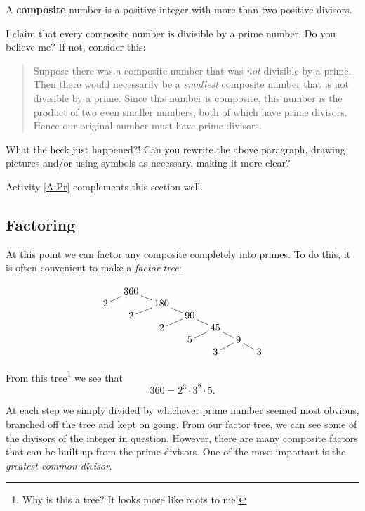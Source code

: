 \begin{definition} 
A \textbf{composite} number is a positive integer with more than two
positive divisors.
\end{definition}

I claim that every composite number is divisible by a prime number. Do
you believe me? If not, consider this:
\begin{quote}
Suppose there was a composite number that was \textit{not} divisible
by a prime. Then there would necessarily be a \textit{smallest}
composite number that is not divisible by a prime. Since this number
is composite, this number is the product of two even smaller numbers,
both of which have prime divisors. Hence our original number must have
prime divisors.
\end{quote}
\begin{question} 
What the heck just happened?! Can you rewrite the above paragraph,
drawing pictures and/or using symbols as necessary, making it more
clear?
\end{question}
\QM


\begin{activitynote}
Activity \ref{A:Pr} complements this section well.  %
\end{activitynote}


\subsection{Factoring}

At this point we can factor any composite completely into primes. To
do this, it is often convenient to make a \textit{factor
  tree}:

\[
\xymatrix@R=0pt@C=10pt{
  & 360 \ar@{-}[dl] \ar@{-}[dr] & & & & &\\
2 &     & 180 \ar@{-}[dl] \ar@{-}[dr] & & & & \\ 
  &  2   &     & 90 \ar@{-}[dl] \ar@{-}[dr] & & & \\
  &      &  2  &    & 45  \ar@{-}[dl] \ar@{-}[dr] & & \\ 
  &      &     & 5  &    & 9 \ar@{-}[dl] \ar@{-}[dr] &\\ 
  &      &     &    &  3  &  & 3
}
\]

From this tree\footnote{Why is this a tree? It looks more like roots to me!} we see that
\[
360 = 2^3 \cdot 3^2 \cdot 5.
\]

At each step we simply divided by whichever prime number seemed most
obvious, branched off the tree and kept on going. From our factor
tree, we can see some of the divisors of the integer in
question. However, there are many composite factors that can be built
up from the prime divisors. One of the most important is the
\textit{greatest common divisor}.

